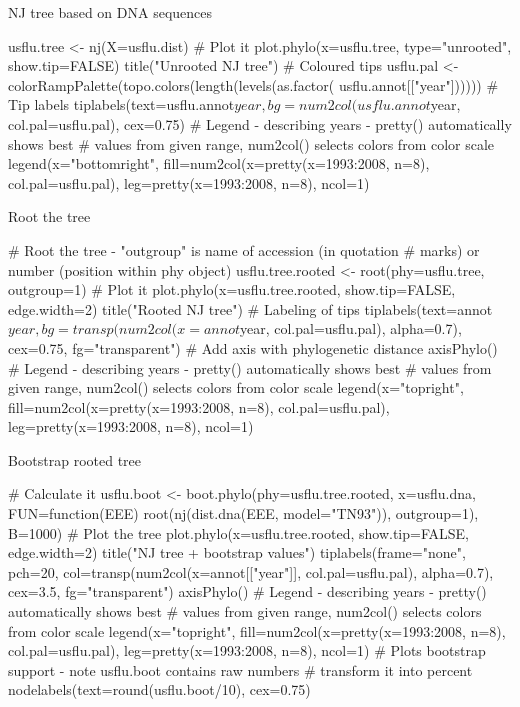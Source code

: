 \documentclass[compress, ucs, xelatex, 11pt, xcolor=svgnames,
  hyperref={
    bookmarks=true,
    unicode=true,
    colorlinks=true,
    pdftitle={Molecular data in R},
    plainpages=false,
    pdfauthor={Vojtech Zeisek},
    pdfsubject={Course about phylogeny and evolution in R},
    pdfcreator={XeLaTeX},
    pdfkeywords={R, evolution, phylogeny, molecular data},
    linkcolor=Tomato,
    anchorcolor=SaddleBrown,
    citecolor=Goldenrod,
    filecolor=DarkMagenta,
    menucolor=Sienna,
    urlcolor=DarkTurquoise,
    pdftex},
  url={hyphens, lowtilde} %
  ]{beamer}
\begin{document}
\begin{frame}[fragile]{NJ tree based on DNA sequences}
  \begin{spluscode}
    usflu.tree <- nj(X=usflu.dist)
    # Plot it
    plot.phylo(x=usflu.tree, type="unrooted", show.tip=FALSE)
    title("Unrooted NJ tree")
    # Coloured tips
    usflu.pal <- colorRampPalette(topo.colors(length(levels(as.factor(
      usflu.annot[["year"])))))
    # Tip labels
    tiplabels(text=usflu.annot$year, bg=num2col(usflu.annot$year,
      col.pal=usflu.pal), cex=0.75)
    # Legend - describing years - pretty() automatically shows best
    # values from given range, num2col() selects colors from color scale
    legend(x="bottomright", fill=num2col(x=pretty(x=1993:2008, n=8),
      col.pal=usflu.pal), leg=pretty(x=1993:2008, n=8), ncol=1)
  \end{spluscode}
\end{frame}

\begin{frame}[fragile]{Root the tree}
  \begin{spluscode}
    # Root the tree - "outgroup" is name of accession (in quotation
    # marks) or number (position within phy object)
    usflu.tree.rooted <- root(phy=usflu.tree, outgroup=1)
    # Plot it
    plot.phylo(x=usflu.tree.rooted, show.tip=FALSE, edge.width=2)
    title("Rooted NJ tree")
    # Labeling of tips
    tiplabels(text=annot$year, bg=transp(num2col(x=annot$year,
      col.pal=usflu.pal), alpha=0.7), cex=0.75, fg="transparent")
    # Add axis with phylogenetic distance
    axisPhylo()
    # Legend - describing years - pretty() automatically shows best
    # values from given range, num2col() selects colors from color scale
    legend(x="topright", fill=num2col(x=pretty(x=1993:2008, n=8),
      col.pal=usflu.pal), leg=pretty(x=1993:2008, n=8), ncol=1)
  \end{spluscode}
\end{frame}

\begin{frame}[fragile]{Bootstrap rooted tree}
  \begin{spluscode}
    # Calculate it
    usflu.boot <- boot.phylo(phy=usflu.tree.rooted, x=usflu.dna,
      FUN=function(EEE) root(nj(dist.dna(EEE, model="TN93")),
      outgroup=1), B=1000)
    # Plot the tree
    plot.phylo(x=usflu.tree.rooted, show.tip=FALSE, edge.width=2)
    title("NJ tree + bootstrap values")
    tiplabels(frame="none", pch=20, col=transp(num2col(x=annot[["year"]],
      col.pal=usflu.pal), alpha=0.7), cex=3.5, fg="transparent")
    axisPhylo()
    # Legend - describing years - pretty() automatically shows best
    # values from given range, num2col() selects colors from color scale
    legend(x="topright", fill=num2col(x=pretty(x=1993:2008, n=8),
      col.pal=usflu.pal), leg=pretty(x=1993:2008, n=8), ncol=1)
    # Plots bootstrap support - note usflu.boot contains raw numbers
    # transform it into percent
    nodelabels(text=round(usflu.boot/10), cex=0.75)
  \end{spluscode}
\end{frame}
\end{document}
